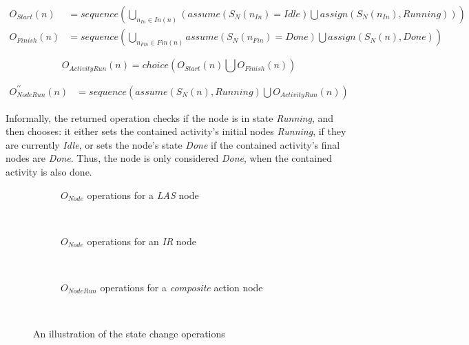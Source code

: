 \begin{definition}
	\begin{align*}
		O_\mathit{Start}(n) &= \mathit{sequence}\left(
			\bigcup_{n_\mathit{In} \in \mathit{In}(n)} \left(\mathit{assume}(S_N(n_\mathit{In}) = \mathit{Idle}) \bigcup \mathit{assign}(S_N(n_\mathit{In}), \mathit{Running})
		\right)\right)\\
		O_\mathit{Finish}(n) &= \mathit{sequence}\left(
			\bigcup_{n_\mathit{Fin} \in \mathit{Fin}(n)} \mathit{assume}(S_N(n_\mathit{Fin}) = \mathit{Done}) \bigcup \mathit{assign}(S_N(n), \mathit{Done})
		\right)
	\end{align*}

	\begin{equation*}
		O_\mathit{ActivityRun}(n) = \mathit{choice}\left(O_\mathit{Start}(n) \bigcup O_\mathit{Finish}(n)\right)
	\end{equation*}
	
	\begin{align*}
		O_\mathit{NodeRun}^{\prime\prime}(n) &= \mathit{sequence}\left(\mathit{assume}(S_N(n), \mathit{Running}) \bigcup O_\mathit{ActivityRun}(n)\right)
	\end{align*}

	Informally, the returned operation checks if the node is in state \emph{Running}, and then chooses: it either sets the contained activity's initial nodes \emph{Running}, if they are currently \emph{Idle}, or sets the node's state \emph{Done} if the contained activity's final nodes are \emph{Done}. Thus, the node is only considered \emph{Done}, when the contained activity is also done.

\end{definition}

\begin{figure}[!ht]
\centering
\begin{subfigure}[b]{\textwidth}
	\centering
	
	\caption{\(O_\mathit{Node}\) operations for a \emph{LAS} node}
	\label{fig:activity-state-function-las}
\end{subfigure}\\
\vspace{10mm}
\begin{subfigure}[b]{\textwidth}
	\centering
	
	\caption{\(O_\mathit{Node}\) operations for an \emph{IR} node}
	\label{fig:activity-state-function-ir}
\end{subfigure}\\
\vspace{10mm}
\begin{subfigure}[b]{\textwidth}
	\centering
	
	\caption{\(O_\mathit{NodeRun}\) operations for a \emph{composite} action node}
	\label{fig:activity-state-function-composite}
\end{subfigure}\\
\caption{An illustration of the state change operations}
\label{fig:activity-state-functions}
\end{figure}

